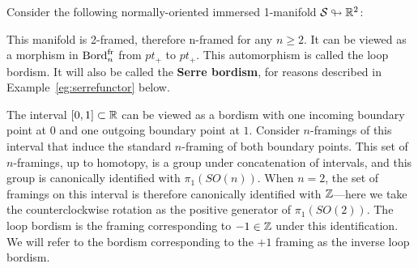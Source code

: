 \documentclass{amsart}
\begin{document}
Consider the following normally-oriented immersed 1-manifold $\mathcal S \looparrowright \mathbb R^2$:
\begin{center}
\end{center}
\nid This manifold is 2-framed, therefore n-framed for any $n \geq 2$.  It can be viewed as a morphism in $\mathrm{Bord}^\mathrm{fr}_n$ from $pt_+$ to $pt_+$.  This automorphism is called the loop bordism.  It will also be called the {\bfseries Serre bordism}, for reasons described in Example~\ref{eg:serrefunctor} below.

\begin{remark}
The interval $[0,1] \subset \mathbb R$ can be viewed as a bordism with one incoming boundary point at $0$ and one outgoing boundary point at $1$.  Consider $n$-framings of this interval that induce the standard $n$-framing of both boundary points.  This set of $n$-framings, up to homotopy, is a group under concatenation of intervals, and this group is canonically identified with $\pi_1(SO(n))$.  When $n=2$, the set of framings on this interval is therefore canonically identified with $\mathbb Z$---here we take the counterclockwise rotation as the positive generator of $\pi_1(SO(2))$.  The loop bordism is the framing corresponding to $-1 \in \mathbb Z$ under this identification.  We will refer to the bordism corresponding to the $+1$ framing as the inverse loop bordism.
\end{remark}
\end{document}
